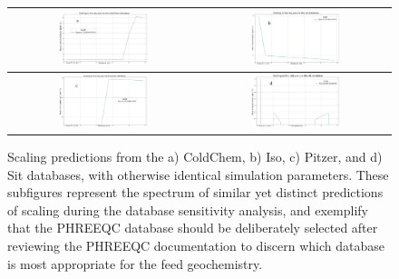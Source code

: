 \begin{figure}
    \centering
    \begin{tabular}{c|c}
        \includegraphics[width=0.49\textwidth]{images/ROSSpy/sensitivity_analyses/databases/ColdChem.png} 
        & \includegraphics[width=0.49\textwidth]{images/ROSSpy/sensitivity_analyses/databases/Iso.png} \\ \midrule 
        \includegraphics[width=0.49\textwidth]{images/ROSSpy/sensitivity_analyses/databases/Pitzer.png} 
        & \includegraphics[width=0.49\textwidth]{images/ROSSpy/sensitivity_analyses/databases/Sit.png} 
        \\ \bottomrule
    \end{tabular}
    \caption{
        Scaling predictions from the a) ColdChem, b) Iso, c) Pitzer, and d) Sit databases, with otherwise identical simulation parameters. These subfigures represent the spectrum of similar yet distinct predictions of scaling during the database sensitivity analysis, and exemplify that the PHREEQC database should be deliberately selected after reviewing the PHREEQC documentation to discern which database is most appropriate for the feed geochemistry.
    }
    \label{database_selection}
\end{figure}

